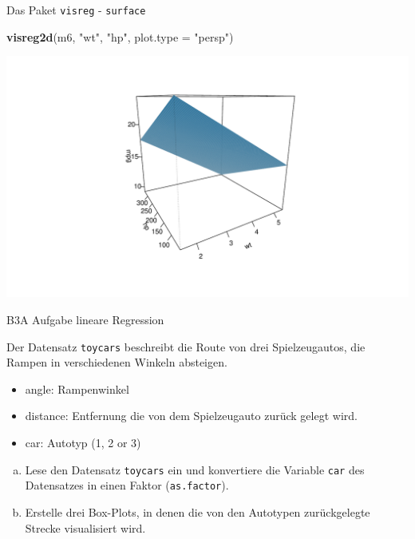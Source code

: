 \documentclass[ignorenonframetext,]{beamer}
\newenvironment{Shaded}{\begin{snugshade}}{\end{snugshade}}
\newcommand{\DataTypeTok}[1]{\textcolor[rgb]{0.13,0.29,0.53}{#1}}
\newcommand{\KeywordTok}[1]{\textcolor[rgb]{0.13,0.29,0.53}{\textbf{#1}}}
\newcommand{\NormalTok}[1]{#1}
\newcommand{\StringTok}[1]{\textcolor[rgb]{0.31,0.60,0.02}{#1}}
\providecommand{\tightlist}{%
  \setlength{\itemsep}{0pt}\setlength{\parskip}{0pt}}
\begin{document}
\begin{frame}[fragile]{Das Paket \texttt{visreg} - \texttt{surface}}
\protect\hypertarget{das-paket-visreg---surface}{}

\begin{Shaded}
\begin{Highlighting}[]
\KeywordTok{visreg2d}\NormalTok{(m6, }\StringTok{"wt"}\NormalTok{, }\StringTok{"hp"}\NormalTok{, }\DataTypeTok{plot.type =} \StringTok{"persp"}\NormalTok{)}
\end{Highlighting}
\end{Shaded}

\includegraphics{B3_linreg_files/figure-beamer/unnamed-chunk-44-1.pdf}

\end{frame}

\begin{frame}[fragile]{B3A Aufgabe lineare Regression}
\protect\hypertarget{b3a-aufgabe-lineare-regression}{}

Der Datensatz \texttt{toycars} beschreibt die Route von drei
Spielzeugautos, die Rampen in verschiedenen Winkeln absteigen.

\begin{itemize}
\tightlist
\item
  angle: Rampenwinkel
\item
  distance: Entfernung die von dem Spielzeugauto zurück gelegt wird.
\item
  car: Autotyp (1, 2 or 3)
\end{itemize}

\begin{enumerate}
[a)]
\tightlist
\item
  Lese den Datensatz \texttt{toycars} ein und konvertiere die Variable
  \texttt{car} des Datensatzes in einen Faktor (\texttt{as.factor}).
\end{enumerate}

\begin{enumerate}
[(a)]
\setcounter{enumi}{1}
\tightlist
\item
  Erstelle drei Box-Plots, in denen die von den Autotypen zurückgelegte
  Strecke visualisiert wird.
\end{enumerate}

\end{frame}
\end{document}

